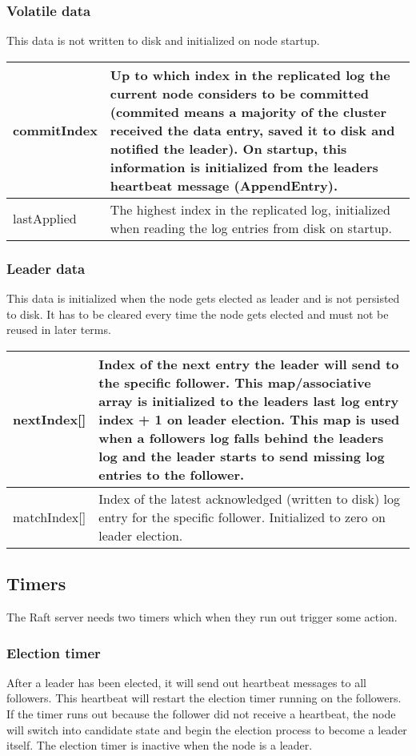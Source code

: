 \subsubsection*{Volatile data}

This data is not written to disk and initialized on node startup.

\begin{tabular}{ | l | p{13.7cm} | }
\hline
commitIndex & Up to which index in the replicated log the current node considers to be committed (commited means a majority of the cluster
received the data entry, saved it to disk and notified the leader). On startup, this information is initialized from the leaders heartbeat message (AppendEntry). \\ \hline
lastApplied & The highest index in the replicated log, initialized when reading the log entries from disk on startup. \\ \hline
\end{tabular}

\subsubsection*{Leader data}

This data is initialized when the node gets elected as leader and is not persisted to disk.
It has to be cleared every time the node gets elected and must not be reused in later terms.

\begin{tabular}{ | l | p{13.7cm} | }
\hline
nextIndex[] & Index of the next entry the leader will send to the specific follower. This map/associative array is initialized to the leaders last log entry index + 1 on leader election.
This map is used when a followers log falls behind the leaders log and the leader starts to send missing log entries to the follower. \\ \hline
matchIndex[] & Index of the latest acknowledged (written to disk) log entry for the specific follower. Initialized to zero on leader election. \\ \hline
\end{tabular}

\subsection{Timers}
The Raft server needs two timers which when they run out trigger some action.

\subsubsection*{Election timer}
After a leader has been elected, it will send out heartbeat messages to all followers. This heartbeat
will restart the election timer running on the followers. If the timer runs out because the follower did not 
receive a heartbeat, the node will switch into candidate state and begin the election process to become a leader itself.
The election timer is inactive when the node is a leader.


